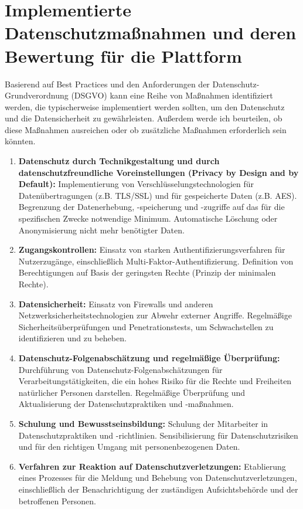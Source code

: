 \chapter{Implementierte Datenschutzmaßnahmen und deren Bewertung für die Plattform}

Basierend auf Best Practices und den Anforderungen der Datenschutz-Grundverordnung (DSGVO) kann eine Reihe von Maßnahmen identifiziert werden, die typischerweise implementiert werden sollten, um den Datenschutz und die Datensicherheit zu gewährleisten. Außerdem werde ich beurteilen, ob diese Maßnahmen ausreichen oder ob zusätzliche Maßnahmen erforderlich sein könnten.

\begin{enumerate}
    
    \item \textbf{Datenschutz durch Technikgestaltung und durch datenschutzfreundliche Voreinstellungen (Privacy by Design and by Default):}
    Implementierung von Verschlüsselungstechnologien für Datenübertragungen (z.B. TLS/SSL) und für gespeicherte Daten (z.B. AES).
    Begrenzung der Datenerhebung, -speicherung und -zugriffe auf das für die spezifischen Zwecke notwendige Minimum.
    Automatische Löschung oder Anonymisierung nicht mehr benötigter Daten.
    
    \item \textbf{Zugangskontrollen:}
    Einsatz von starken Authentifizierungsverfahren für Nutzerzugänge, einschließlich Multi-Faktor-Authentifizierung.
    Definition von Berechtigungen auf Basis der geringsten Rechte (Prinzip der minimalen Rechte).
    
    \item \textbf{Datensicherheit:}
    Einsatz von Firewalls und anderen Netzwerksicherheitstechnologien zur Abwehr externer Angriffe.
    Regelmäßige Sicherheitsüberprüfungen und Penetrationstests, um Schwachstellen zu identifizieren und zu beheben.
    
    \item \textbf{Datenschutz-Folgenabschätzung und regelmäßige Überprüfung:}
    Durchführung von Datenschutz-Folgenabschätzungen für Verarbeitungstätigkeiten, die ein hohes Risiko für die Rechte und Freiheiten natürlicher Personen darstellen.
    Regelmäßige Überprüfung und Aktualisierung der Datenschutzpraktiken und -maßnahmen.
    
    \item \textbf{Schulung und Bewusstseinsbildung:}
    Schulung der Mitarbeiter in Datenschutzpraktiken und -richtlinien.
    Sensibilisierung für Datenschutzrisiken und für den richtigen Umgang mit personenbezogenen Daten.
    
    \item \textbf{Verfahren zur Reaktion auf Datenschutzverletzungen:}
    Etablierung eines Prozesses für die Meldung und Behebung von Datenschutzverletzungen, einschließlich der Benachrichtigung der zuständigen Aufsichtsbehörde und der betroffenen Personen.
\end{enumerate}
    
